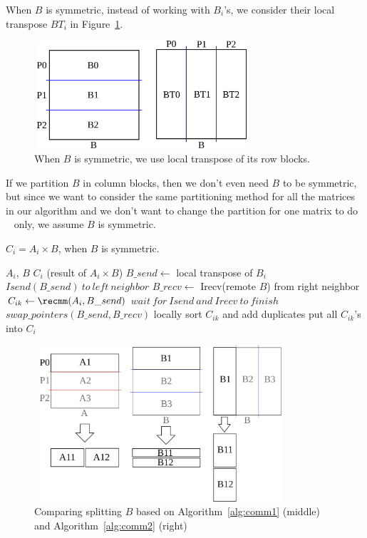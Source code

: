 When $B$ is symmetric, instead of working with $B_i$'s, we consider their local transpose $BT_i$ in Figure~\ref{fig:partition4}.

\begin{figure}[tbh]
    \centering
    \includegraphics[width=8cm,height=4cm]{./figures/partition4.pdf}
    \caption{When $B$ is symmetric, we use local transpose of its row blocks.}
    \label{fig:partition4}
\end{figure}

If we partition $B$ in column blocks, then we don't even need $B$ to be symmetric, but since we want to consider the same partitioning method for all the matrices in our algorithm and we don't want to change the partition for one matrix to do \mm~ only, we assume $B$ is symmetric.

\begin{algorithm}[H] 
  \caption{$C_i = A_i \times B$, when $B$ is symmetric.}
  \begin{algorithmic}[1]
    \Require $A_i$, $B$
    \Ensure  $C_i$ (result of $A_i \times B$)
    \State $B\_send \leftarrow$ local transpose of $B_i$
      \State $Isend(B\_send)\ to\ left\ neighbor$
      \State $B\_recv \leftarrow$ Irecv(remote $B$) from right neighbor
      \State $C_{ik} \leftarrow \recmm(A_i, B\_send)$ 
      \State $wait\ for\ Isend\ and\ Irecv\ to\ finish$
      \State $swap\_pointers(B\_send,B\_recv)$
      \State locally sort $C_{ik}$ and add duplicates
    \EndFor
    \State put all $C_{ik}$'s into $C_i$
  \end{algorithmic}
  \label{alg:comm2} 
\end{algorithm}

\begin{figure}[!thb]
    \centering
    \includegraphics[width=9.4cm,height=5.8cm]{./figures/partition6.pdf}
    \caption{Comparing splitting $B$ based on Algorithm~\ref{alg:comm1} (middle) and Algorithm~\ref{alg:comm2} (right)}
    \label{fig:partition6}
\end{figure}

